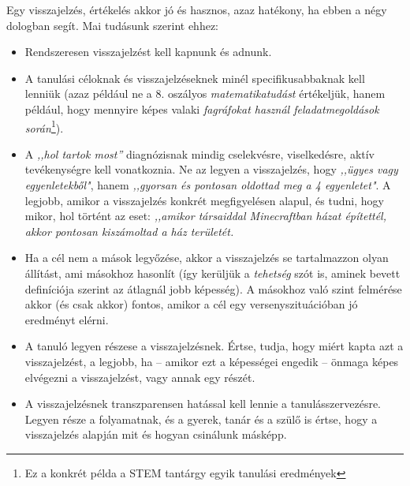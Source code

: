 Egy visszajelzés, értékelés akkor jó és hasznos, azaz hatékony, ha ebben a négy
dologban segít. Mai tudásunk szerint ehhez:
\begin{itemize}
      \item Rendszeresen visszajelzést kell kapnunk és adnunk.
      \item A tanulási céloknak és visszajelzéseknek minél specifikusabbaknak
            kell
            lenniük (azaz például ne a 8. oszályos \emph{matematikatudást}
            értékeljük,
            hanem például, hogy mennyire képes valaki \emph{fagráfokat
                  használ
                  feladatmegoldások során}\footnote{Ez a konkrét példa a STEM
                  tantárgy
                  egyik
                  tanulási eredmények}).
      \item A \emph{,,hol tartok most''} diagnózisnak mindig cselekvésre,
            viselkedésre, aktív tevékenységre kell vonatkoznia. Ne az legyen a
            visszajelzés, hogy \emph{,,ügyes vagy egyenletekből"}, hanem
            \emph{,,gyorsan és
                  pontosan oldottad meg a 4 egyenletet"}. A legjobb, amikor a
            visszajelzés
            konkrét megfigyelésen alapul, és tudni, hogy mikor, hol történt az
            eset:
            \emph{,,amikor társaiddal Minecraftban házat építettél, akkor
                  pontosan
                  kiszámoltad a ház területét.}
      \item Ha a cél nem a mások legyőzése, akkor a visszajelzés se
            tartalmazzon
            olyan állítást, ami másokhoz hasonlít (így kerüljük a
            \emph{tehetség}
            szót is,
            aminek bevett definíciója szerint az átlagnál jobb képesség). A
            másokhoz való
            szint felmérése akkor (és csak akkor) fontos, amikor a cél egy
            versenyszituációban jó eredményt elérni.

      \item A tanuló legyen részese a visszajelzésnek. Értse, tudja, hogy miért
            kapta
            azt a visszajelzést, a legjobb, ha -- amikor ezt a képességei
            engedik
            -- önmaga
            képes elvégezni a visszajelzést, vagy annak egy részét.
      \item A visszajelzésnek transzparensen hatással kell lennie a
            tanulásszervezésre. Legyen része a folyamatnak, és a gyerek, tanár
            és a
            szülő
            is értse, hogy a visszajelzés alapján mit és hogyan csinálunk
            másképp.
\end{itemize}

